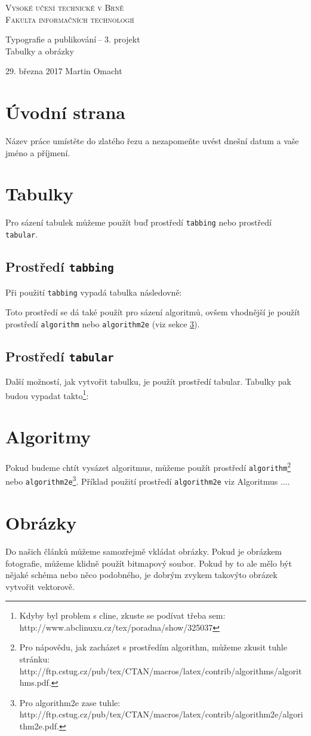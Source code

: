 \documentclass[11pt,a4paper]{article}
\begin{document}
	\begin{titlepage}
		\begin{center}
			\Huge
			\textsc{Vysoké učení technické v Brně\\[-2mm]
			\huge Fakulta informačních technologií}
		
			
			\LARGE
			Typografie a publikování\,-- 3. projekt\\[-0.5mm]
			\Huge Tabulky a obrázky
		\end{center}
		{\Large 29. března 2017 \hfill Martin Omacht}
	\end{titlepage}
	
	\section{Úvodní strana}
	Název práce umístěte do zlatého řezu a nezapomeňte uvést dnešní datum a vaše jméno a příjmení.
	
	\section{Tabulky}
	Pro sázení tabulek můžeme použít buď prostředí \texttt{tabbing} nebo prostředí \texttt{tabular}.

	\subsection{Prostředí \texttt{tabbing}}
	Při použití \texttt{tabbing} vypadá tabulka následovně:
	
	Toto prostředí se dá také použít pro sázení algoritmů, ovšem vhodnější je použít prostředí \texttt{algorithm} nebo \texttt{algorithm2e} (viz sekce \ref{algoritmy}).

	\subsection{Prostředí \texttt{tabular}}
	Další možností, jak vytvořit tabulku, je použít prostředí tabular. Tabulky pak 
	budou vypadat takto\footnote{Kdyby byl problem s cline, zkuste se podívat třeba sem: http://www.abclinuxu.cz/tex/poradna/show/325037}:

	\section{Algoritmy} \label{algoritmy}
	Pokud budeme chtít vysázet algoritmus, můžeme použít prostředí \texttt{algorithm}\footnote{Pro nápovědu, jak zacházet s prostředím algorithm, můžeme zkusit tuhle stránku: http://ftp.cstug.cz/pub/tex/CTAN/macros/latex/contrib/algorithms/algorithms.pdf.} nebo \texttt{algorithm2e}\footnote{Pro algorithm2e zase tuhle: http://ftp.cstug.cz/pub/tex/CTAN/macros/latex/contrib/algorithm2e/algorithm2e.pdf.}. Příklad použití prostředí \texttt{algorithm2e} viz Algoritmus ....

	\section{Obrázky}
	Do našich článků můžeme samozřejmě vkládat obrázky. Pokud je obrázkem fotografie,
	můžeme klidně použít bitmapový soubor. Pokud by to ale mělo být nějaké schéma nebo něco podobného, je dobrým zvykem takovýto obrázek vytvořit vektorově.
\end{document}
